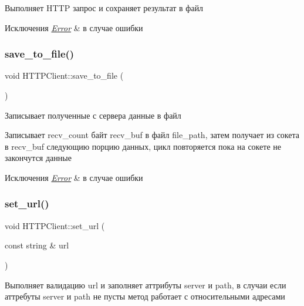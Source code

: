 Выполняет H\+T\+TP запрос и сохраняет результат в файл 


\begin{DoxyExceptions}{Исключения}
{\em \mbox{\hyperlink{classError}{Error}}} & в случае ошибки \\
\hline
\end{DoxyExceptions}
\mbox{\label{classHTTPClient_a8b630cb2b3669bd770007f1e526a7c46}} 
\subsubsection{\texorpdfstring{save\_to\_file()}{save\_to\_file()}}
{\footnotesize\ttfamily void H\+T\+T\+P\+Client\+::save\+\_\+to\+\_\+file (\begin{DoxyParamCaption}{ }\end{DoxyParamCaption})\hspace{0.3cm}{\ttfamily [private]}}



Записывает полученные с сервера данные в файл 

Записывает recv\+\_\+count байт recv\+\_\+buf в файл file\+\_\+path, затем получает из сокета в recv\+\_\+buf следующию порцию данных, цикл повторяется пока на сокете не закончутся данные 
\begin{DoxyExceptions}{Исключения}
{\em \mbox{\hyperlink{classError}{Error}}} & в случае ошибки \\
\hline
\end{DoxyExceptions}
\mbox{\label{classHTTPClient_ab5e2edcaacc8fe488fc84b8deea3fb61}} 
\subsubsection{\texorpdfstring{set\_url()}{set\_url()}}
{\footnotesize\ttfamily void H\+T\+T\+P\+Client\+::set\+\_\+url (\begin{DoxyParamCaption}\item[{const string \&}]{url }\end{DoxyParamCaption})}



Выполняет валидацию url и заполняет аттрибуты server и path, в случаи если аттребуты server и path не пусты метод работает с относительными адресами 


